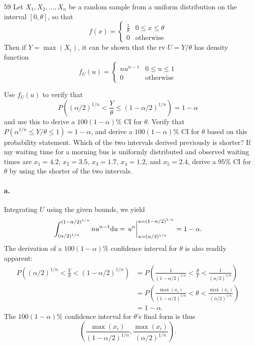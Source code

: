 \documentclass{exam}
\newcommand{\paren}[1]{\left(#1\right)}
\begin{document}
\begin{problem}{59}
	Let $X_1, X_2, \dots, X_n$ be a random sample from a uniform distribution on the interval $[0, \theta]$, so that
	\[
		f(x) = \begin{cases}
			\displaystyle \frac1\theta & 0 \le x \le \theta \\
			0 & \text{otherwise}
		\end{cases}
	\]
	Then if $Y = \max(X_i)$, it can be shown that the rv $U = Y/\theta$ has density function
	\[
		f_U(u) = \begin{cases}
			nu^{n - 1} & 0 \le u \le 1 \\
			0 & \text{otherwise}
		\end{cases}
	\]
	\begin{tasks}[label=\textbf{\alph*.}]
		\task Use $f_U(u)$ to verify that
		\[
			P\paren{(\alpha/2)^{1/n} < \frac{Y}{\theta} \le (1 - \alpha/2)^{1/n}} = 1 - \alpha
		\]
		and use this to derive a $100(1 - \alpha)\%$ CI for $\theta$.
		\task Verify that $P(\alpha^{1/n} \le Y/\theta \le 1) = 1 - \alpha$, and derive a $100(1 - \alpha)\%$ CI for $\theta$ based on this probability statement.
		\task Which of the two intervals derived previously is shorter? If my waiting time for a morning bus is uniformly distributed and observed waiting times are $x_1 = 4.2$, $x_2 = 3.5$, $x_3 = 1.7$, $x_4 = 1.2$, and $x_5 = 2.4$, derive a $95\%$ CI for $\theta$ by using the shorter of the two intervals.
	\end{tasks}
\end{problem}

\paragraph{a.} Integrating $U$ using the given bounds, we yield
\[
	\int_{(\alpha/2)^{1/n}}^{(1 - \alpha/2)^{1/n}} nu^{n - 1}\dd u = \eval{u^n}_{u = (\alpha/2)^{1/n}}^{u = (1 - \alpha/2)^{1/n}} = 1 - \alpha.
\]
The derivation of a $100(1 - \alpha)\%$ confidence interval for $\theta$ is also readily apparent:
\begin{align*}
	P\paren{(\alpha/2)^{1/n} < \frac{Y}{\theta} < (1 - \alpha/2)^{1/n}} &= P\paren{\frac1{(1 - \alpha/2)^{1/n}} < \frac{\theta}{Y} < \frac1{(\alpha/2)^{1/n}}} \\
	&= P\paren{\frac{\max(x_i)}{(1 - \alpha/2)^{1/n}} < \theta < \frac{\max(x_i)}{(\alpha/2)^{1/n}}} \\
	&= 1 - \alpha.
\end{align*}
The $100(1 - \alpha)\%$ confidence interval for $\theta$'s final form is thus
\[
	\paren{\frac{\max(x_i)}{(1 - \alpha/2)^{1/n}}, \frac{\max(x_i)}{(\alpha/2)^{1/n}}}.
\]
\end{document}
